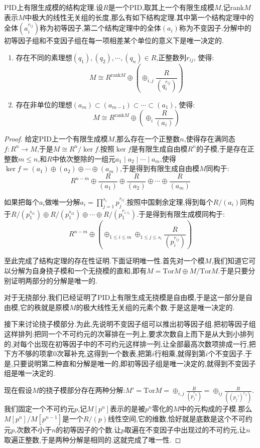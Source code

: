 PID上有限生成模的结构定理.设$R$是一个PID,取其上一个有限生成模$M$,记rank$M$表示$M$中极大的线性无关组的长度,那么有如下结构定理.其中第一个结构定理中的全体$(a_i^{r_{ij}})$称为初等因子,第二个结构定理中的全体$(a_i)$称为不变因子.分解中的初等因子组和不变因子组在每一项相差某个单位的意义下是唯一决定的.
\begin{enumerate}
	\item 存在不同的素理想$(q_1),(q_2),\cdots,(q_n)\in R$,正整数列$r_ {ij}$, 使得:
	$$M\cong R^{\mathrm{rank} M}\oplus\left(\oplus_{i,j}\frac{R}{(q_i^{r_{ij}})}\right)$$
	\item 存在非单位的理想$(a_m)\subset (a_{m-1})\subset\cdots\subset(a_1)$, 使得:
	$$M\cong R^{\mathrm{rank} M}\oplus\left(\oplus_{i}\frac{R}{(a_i)}\right)$$
\end{enumerate}
\begin{proof}
	
	给定PID上一个有限生成模$M$,那么存在一个正整数$n$,使得存在满同态$f:R^n\to M$,于是$M\cong R^n/\ker f$.按照$\ker f$是有限生成自由模$R^n$的子模,于是存在正整数$m\le n$,和$R$中依次整除的一组元$a_1\mid a_2\mid\cdots\mid a_m$,使得$\ker f=(a_1)\oplus (a_2)\oplus\cdots\oplus (a_m)$,于是得到有限生成自由模$M$同构于:
	$$R^{n-m}\oplus\frac{R}{(a_1)}\oplus\frac{R}{(a_2)}\oplus\cdots\oplus\frac{R}{(a_m)}$$
	
	如果把每个$a_i$做唯一分解$a_i=\prod_{j=1}^{s_i}p_{j}^{r_{ij}}$.按照中国剩余定理,得到每个$R/(a_i)$同构于$R/(p_1^{s_{i1}})\oplus R/(p_1^{s_{i2}})\oplus\cdots\oplus R/(p_1^{r_{i,s_i}})$.于是得到有限生成模同构于:
	$$R^{n-m}\oplus\left(\oplus_{1\le i\le m}\oplus_{1\le j\le s_i}\frac{R}{(p_i^{r_{ij}})}\right)$$
	
	至此完成了结构定理的存在性证明.下面证明唯一性.首先对一个模$M$,我们知道它可以分解为自身挠子模和一个无挠模的直和,即有$M=\mathrm{Tor}M\oplus M/\mathrm{Tor}M$.于是只要分别证明两部分的分解是唯一的.
	
	对于无挠部分,我们已经证明了PID上有限生成无挠模是自由模,于是这一部分是自由模,它的秩就是原模$M$的极大线性无关组的元素个数.于是这是唯一决定的.
	
	接下来讨论挠子模部分.为此,先说明不变因子组可以推出初等因子组.把初等因子组这样排列:把同一个不可约元的次幂排在一列上,要求次数自上而下是从大到小排列的,对每个出现在初等因子中的不可约元这样排一列,让全部最高次数项排成一行,把下方不够的项拿0次幂补充,这得到一个数表,把第$i$行相乘,就得到第$i$个不变因子.于是,只要说明第二种直和分解是唯一的,即初等因子组是唯一决定的,就得到不变因子组是唯一决定的.
	
	现在假设$M$的挠子模部分存在两种分解:$M'=\mathrm{Tor}M=\oplus_{i,j}\frac{R}{(p_j^{r_{ij}})}=\oplus_{ij}\frac{R}{((p_j')^{r_{ij}})}$.我们固定一个不可约元$p$,记$M[p^n]$表示的是被$p^n$零化的$M$中的元构成的子模.那么$M[p^n]/M[p^{n-1}]$是一个$R/(p)$线性空间,它的维数,恰好就是底数是这个不可约元$p$,次数不小于$n$的初等因子的个数.让$p$取遍在不变因子中出现过的不可约元,让$n$取遍正整数,于是两种分解是相同的.这就完成了唯一性.
\end{proof}

